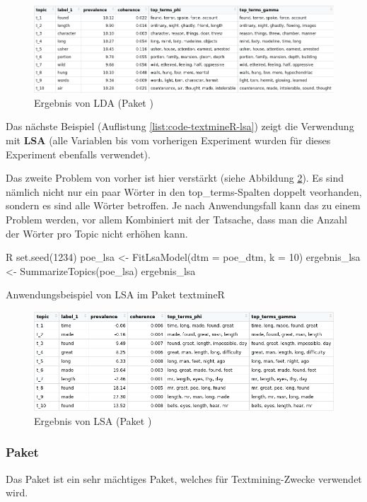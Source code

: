 \begin{figure}
    \centering
    \includegraphics[scale=0.45]{images/dlengsteiner/ergebnis_textmineR_lda_n.png}
    \caption{Ergebnis von LDA (Paket )}
    \label{fig:res-lda-textmineR}
\end{figure}

Das nächste Beispiel (Auflistung \ref{list:code-textmineR-lsa}) zeigt die Verwendung mit \textbf{LSA} (alle Variablen bis  vom vorherigen Experiment wurden für dieses Experiment ebenfalls verwendet). 

Das zweite Problem von vorher ist hier verstärkt (siehe Abbildung \ref{fig:res-lsa-textmineR}). Es sind nämlich nicht nur ein paar Wörter in den top\_terms-Spalten doppelt veorhanden, sondern es sind alle Wörter betroffen. Je nach Anwendungsfall kann das zu einem Problem werden, vor allem Kombiniert mit der Tatsache, dass man die Anzahl der Wörter pro Topic nicht erhöhen kann.

\begin{listing}
\begin{code}{R}
    set.seed(1234)
    poe_lsa <- FitLsaModel(dtm = poe_dtm, k = 10)
    ergebnis_lsa <- SummarizeTopics(poe_lsa)
    ergebnis_lsa
\end{code}  
    \caption{Anwendungsbeispiel von LSA im Paket textmineR}
    \label{list:code-textmineR-lsa}
\end{listing}

\begin{figure}
    \centering
    \includegraphics[scale=0.5]{images/dlengsteiner/ergebnis_textmineR_lsa.png}
    \caption{Ergebnis von LSA (Paket )}
    \label{fig:res-lsa-textmineR}
\end{figure}



\subsubsection{Paket }

Das Paket  ist ein sehr mächtiges Paket, welches für Textmining-Zwecke verwendet wird. 
